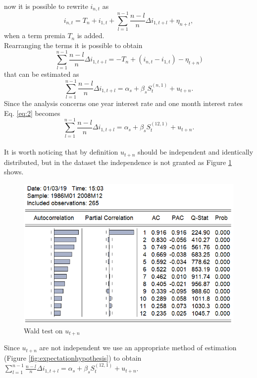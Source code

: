 \documentclass[12pt]{article}
\begin{document}
\\now it is possible to rewrite $i_{n,t}$ as
\begin{equation}
i_{n,t}= T_n + i_{1,t} + \sum_{l=1}^{n-1}\frac{n-l}{n}\Delta i_{1,t+l}+\eta_{n+t},
\end{equation} when a term premia $T_n$ is added.
\\Rearranging the terms it is possible to obtain 
\begin{equation}
\sum_{l=1}^{n-1}\frac{n-l}{n}\Delta i_{1,t+l} = -T_n + (i_{n,t}-i_{1,t}) - \eta_{t+n})
\end{equation} that can be estimated as
\begin{equation} \label{eq:2}
\sum_{l=1}^{n-1}\frac{n-l}{n}\Delta i_{1,t+l} = \alpha_s + \beta_s S^{(n,1)}_t +u_{t+n}.
\end{equation}
Since the analysis concerns one year interest rate and one month interest rates Eq. \ref{eq:2} becomes
\begin{equation} 
\sum_{l=1}^{n-1}\frac{n-l}{n}\Delta i_{1,t+l} = \alpha_s + \beta_s S^{(12,1)}_t +u_{t+n}.
\end{equation}
\\It is worth noticing that by definition $u_{t+n}$ should be independent and identically distributed, but in the dataset the independence is not granted as Figure \ref{fig:testonresiduals} shows.
\begin{figure}[H]
\centering
\includegraphics[scale=1]{test_on_residuals.PNG} 
\caption{Wald test on $u_{t+n}$ \label{fig:testonresiduals}}
\end{figure}
\noindent Since $u_{t+n}$ are not independent we use an appropriate method of estimation (Figure \ref{fig:expectationhypothesis}) to obtain $\sum_{l=1}^{n-1}\frac{n-l}{n}\Delta i_{1,t+l} = \alpha_s + \beta_s S^{(12,1)}_t +u_{t+n}$.
\end{document}
